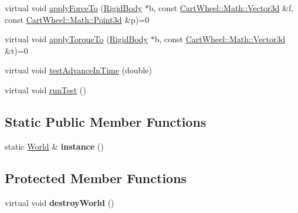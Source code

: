 \begin{DoxyCompactItemize}
\item 
virtual void \hyperlink{classCartWheel_1_1Physics_1_1World_a26058e4671390ada9b3d3b1590f88f1a}{applyForceTo} (\hyperlink{classCartWheel_1_1Physics_1_1RigidBody}{RigidBody} $\ast$b, const \hyperlink{classCartWheel_1_1Math_1_1Vector3d}{CartWheel::Math::Vector3d} \&f, const \hyperlink{classCartWheel_1_1Math_1_1Point3d}{CartWheel::Math::Point3d} \&p)=0
\item 
virtual void \hyperlink{classCartWheel_1_1Physics_1_1World_ae4f6992b0360ac2599a8980621cde06f}{applyTorqueTo} (\hyperlink{classCartWheel_1_1Physics_1_1RigidBody}{RigidBody} $\ast$b, const \hyperlink{classCartWheel_1_1Math_1_1Vector3d}{CartWheel::Math::Vector3d} \&t)=0
\item 
virtual void \hyperlink{classCartWheel_1_1Physics_1_1World_a3eb9011c4c08c2183c1d9a37042e126a}{testAdvanceInTime} (double)
\item 
virtual void \hyperlink{classCartWheel_1_1Physics_1_1World_a2181315ea3069768c0c10f9a9d632f89}{runTest} ()
\end{DoxyCompactItemize}
\subsection*{Static Public Member Functions}
\begin{DoxyCompactItemize}
\item 
\hypertarget{classCartWheel_1_1Physics_1_1World_a869816b691189863562dc412d905138c}{
static \hyperlink{classCartWheel_1_1Physics_1_1World}{World} \& {\bfseries instance} ()}
\label{classCartWheel_1_1Physics_1_1World_a869816b691189863562dc412d905138c}

\end{DoxyCompactItemize}
\subsection*{Protected Member Functions}
\begin{DoxyCompactItemize}
\item 
\hypertarget{classCartWheel_1_1Physics_1_1World_ad4f23168ee864aa7919c2018c4615f77}{
virtual void {\bfseries destroyWorld} ()}
\label{classCartWheel_1_1Physics_1_1World_ad4f23168ee864aa7919c2018c4615f77}

\end{DoxyCompactItemize}
